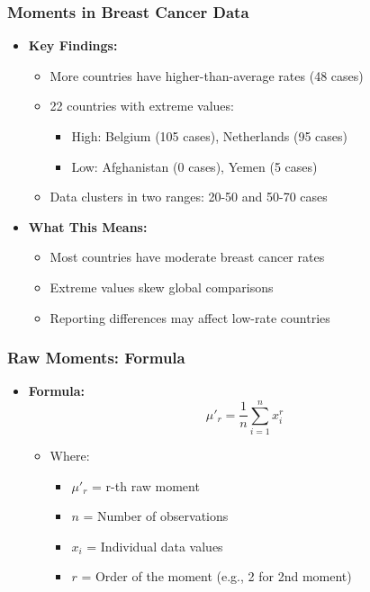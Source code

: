 \begin{frame}
    \frametitle{Moments in Breast Cancer Data}
    \begin{itemize}
        \item \textbf{Key Findings:}
        \begin{itemize}
            \item More countries have higher-than-average rates (48 cases)
            \item 22 countries with extreme values:
                \begin{itemize}
                    \item High: Belgium (105 cases), Netherlands (95 cases)
                    \item Low: Afghanistan (0 cases), Yemen (5 cases)
                \end{itemize}
            \item Data clusters in two ranges: 20-50 and 50-70 cases
        \end{itemize}
        
        \item \textbf{What This Means:}
        \begin{itemize}
            \item Most countries have moderate breast cancer rates
            \item Extreme values skew global comparisons
            \item Reporting differences may affect low-rate countries
        \end{itemize}
    \end{itemize}
\end{frame}

\begin{frame}[fragile]
    \frametitle{Raw Moments: Formula}
    \begin{itemize}
        \item \textbf{Formula:}
              \[
                  \mu'_r = \frac{1}{n} \sum_{i=1}^{n} x_i^r
              \]
              \begin{itemize}
                  \item Where:
                        \begin{itemize}
                            \item $\mu'_r$ = r-th raw moment
                            \item $n$ = Number of observations
                            \item $x_i$ = Individual data values
                            \item $r$ = Order of the moment (e.g., 2 for 2nd moment)
                        \end{itemize}
              \end{itemize}
    \end{itemize}
\end{frame}


